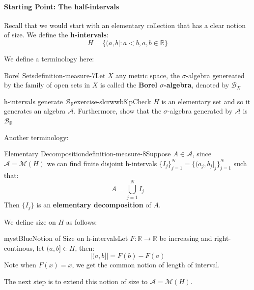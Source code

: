 \paragraph{Starting Point: The half-intervals}

Recall that we would start with an elementary collection that has a clear notion of size. We define the \textbf{h-intervals}:
\begin{equation}
H=\{(a,b]:a<b, a,b\in \mathbb{R}\}
\end{equation}

We define a terminology here:

\begin{mystthmdefinition}{Borel Sets}{definition-measure-7}Let $X$ any metric space, the $\sigma$-algebra genereated by the family of open sets in $X$ is called the \textbf{Borel $\sigma$-algebra}, denoted by $\mathcal B_{X}$

\end{mystthmdefinition}
\begin{mystexercise}{h-intervals generate $\mathcal B_{\mathbb{R}}$}{exercise-slcrwwb8lp}\label{exercise-SLCRwwb8lp}\label{exercise-slcrwwb8lp}Check $H$ is an elementary set and so it generates an algebra $\mathcal A$. Furthermore, show that the $\sigma$-algebra generated by $\mathcal A$ is   $\mathcal B_{\mathbb{R}}$

\end{mystexercise}
Another terminology:

\begin{mystthmdefinition}{Elementary Decomposition}{definition-measure-8}Suppose $A\in \mathcal A$, since $\mathcal A=\mathcal M(H)$ we can find finite disjoint h-intervals $\{I_j\}_{j=1}^N=\{(a_j,b_j]_j\}_{j=1}^N$ such that:
\begin{equation}
A=\bigcup_{j=1}^N I_j
\end{equation}
Then $\{I_j\}$ is an \textbf{elementary decomposition} of $A$.

\end{mystthmdefinition}
We define size on $H$ as follows:

\begin{mystadmonition}{mystBlue}{Notion of Size on h-intervals}Let $F:\mathbb{R}\to\mathbb{R}$ be increasing and right-continous, let $(a,b]\in H$, then:
\begin{equation}
|(a,b]|=F(b)-F(a)
\end{equation}
Note when $F(x)=x$, we get the common notion of length of interval.

\end{mystadmonition}
The next step is to extend this notion of size to $\mathcal A=\mathcal M(H)$.

